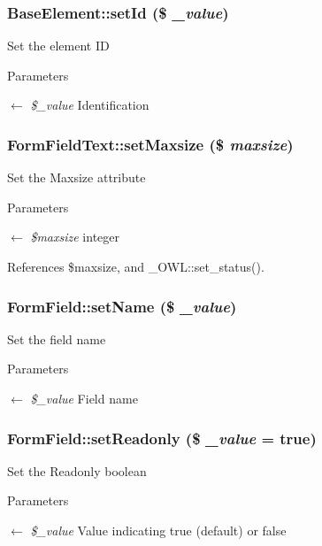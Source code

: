 \subsubsection[{setId}]{\setlength{\rightskip}{0pt plus 5cm}BaseElement::setId (\$ {\em \_\-value})}\label{classBaseElement_a0c1ce3d1684ecb78960cf7a97278494e}
Set the element ID 
\begin{DoxyParams}{Parameters}
\item[\mbox{$\leftarrow$} {\em \$\_\-value}]Identification \end{DoxyParams}
\subsubsection[{setMaxsize}]{\setlength{\rightskip}{0pt plus 5cm}FormFieldText::setMaxsize (\$ {\em maxsize})}\label{classFormFieldText_a91b6ce8a3476c4296fbe1b0802e70984}
Set the Maxsize attribute 
\begin{DoxyParams}{Parameters}
\item[\mbox{$\leftarrow$} {\em \$maxsize}]integer \end{DoxyParams}


References \$maxsize, and \_\-OWL::set\_\-status().

\subsubsection[{setName}]{\setlength{\rightskip}{0pt plus 5cm}FormField::setName (\$ {\em \_\-value})}\label{classFormField_ad57e32bd53170af060e869b3b60f0ef7}
Set the field name 
\begin{DoxyParams}{Parameters}
\item[\mbox{$\leftarrow$} {\em \$\_\-value}]Field name \end{DoxyParams}
\subsubsection[{setReadonly}]{\setlength{\rightskip}{0pt plus 5cm}FormField::setReadonly (\$ {\em \_\-value} = {\ttfamily true})}\label{classFormField_a6eabbb35d24b1698ea25b66ddfd88a64}
Set the Readonly boolean 
\begin{DoxyParams}{Parameters}
\item[\mbox{$\leftarrow$} {\em \$\_\-value}]Value indicating true (default) or false \end{DoxyParams}
